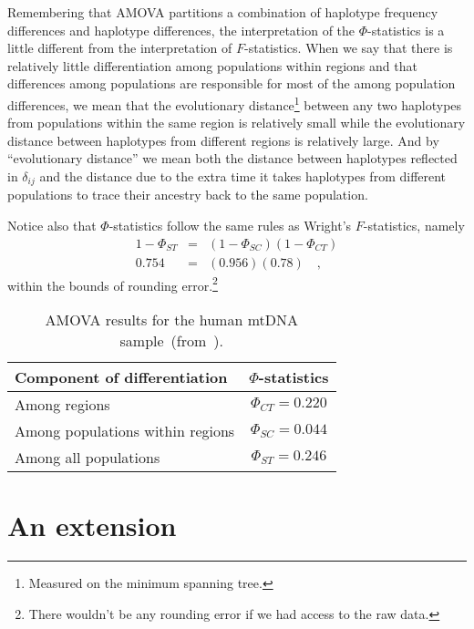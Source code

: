 \documentclass[12pt]{article}
\begin{document}
Remembering that AMOVA partitions a combination of haplotype frequency
differences and haplotype differences, the interpretation of the
$\Phi$-statistics is a little different from the interpretation of
$F$-statistics. When we say that there is relatively little
differentiation among populations within regions and that differences
among populations are responsible for most of the among population
differences, we mean that the evolutionary distance\footnote{Measured
  on the minimum spanning tree.} between any two haplotypes from
populations within the same region is relatively small while the
evolutionary distance between haplotypes from different regions is
relatively large. And by ``evolutionary distance'' we mean both the
distance between haplotypes reflected in $\delta_{ij}$ and the
distance due to the extra time it takes haplotypes from different
populations to trace their ancestry back to the same population.

Notice also that $\Phi$-statistics follow the same rules as Wright's
$F$-statistics, namely
\begin{eqnarray*}
1 - \Phi_{ST} &=& (1 - \Phi_{SC})(1 - \Phi_{CT}) \\
0.754 &=& (0.956)(0.78) \quad ,
\end{eqnarray*}
within the bounds of rounding error.\footnote{There wouldn't be any
  rounding error if we had access to the raw data.}

\begin{table}
\begin{center}
\begin{tabular}{lc}
\hline\hline
Component of differentiation     & $\Phi$-statistics \\
\hline
Among regions                    & $\Phi_{CT} = 0.220$ \\
Among populations within regions & $\Phi_{SC} = 0.044$ \\
Among all populations            & $\Phi_{ST} = 0.246$ \\
\hline
\end{tabular}
\end{center}
\caption{AMOVA results for the human mtDNA
  sample~(from~\cite{Excoffier-etal92}).}\label{table:amova-results}
\end{table}

\section*{An extension}
\end{document}
